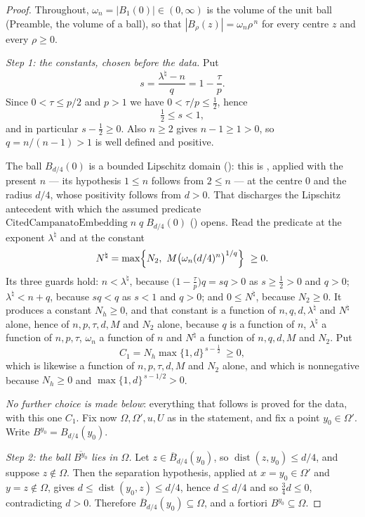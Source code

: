 \begin{proof}
Throughout, $\omega_n=|B_1(0)|\in(0,\infty)$ is the volume of the unit ball
(Preamble, the volume of a ball), so that $|B_\rho(z)|=\omega_n\rho^{\,n}$ for
every centre $z$ and every $\rho\ge0$.

\emph{Step 1: the constants, chosen before the data.}  Put
\[
s=\frac{\lambda^\natural-n}q=1-\frac\tau p .
\]
Since $0<\tau\le p/2$ and $p>1$ we have $0<\tau/p\le\tfrac12$, hence
\[
\tfrac12\le s<1 ,
\]
and in particular $s-\tfrac12\ge0$.  Also $n\ge2$ gives $n-1\ge1>0$, so
$q=n/(n-1)>1$ is well defined and positive.

The ball $B_{d/4}(0)$ is a bounded Lipschitz domain
(): this is ,
applied with the present $n$ --- its hypothesis $1\le n$ follows from $2\le n$
--- at the centre $0$ and the radius $d/4$, whose positivity follows from
$d>0$.  That discharges the Lipschitz antecedent with which the assumed
predicate $\mathrm{CitedCampanatoEmbedding}\;n\;q\;B_{d/4}(0)$
() opens.  Read the predicate at the exponent
$\lambda^\natural$ and at the constant
\[
N^\natural=\max\Bigl\{N_2,\ M\bigl(\omega_n(d/4)^n\bigr)^{1/q}\Bigr\}\ \ge0 .
\]
Its three guards hold: $n<\lambda^\natural$, because
$\bigl(1-\tfrac\tau p\bigr)q=sq>0$ as $s\ge\tfrac12>0$ and $q>0$;
$\lambda^\natural<n+q$, because $sq<q$ as $s<1$ and $q>0$; and
$0\le N^\natural$, because $N_2\ge0$.  It produces a constant $N_h\ge0$, and
that constant is a function of $n,q,d,\lambda^\natural$ and $N^\natural$ alone,
hence of $n,p,\tau,d,M$ and $N_2$ alone, because $q$ is a function of $n$,
$\lambda^\natural$ a function of $n,p,\tau$, $\omega_n$ a function of $n$ and
$N^\natural$ a function of $n,q,d,M$ and $N_2$.  Put
\[
C_1=N_h\max\{1,d\}^{\,s-\frac12}\ \ge0 ,
\]
which is likewise a function of $n,p,\tau,d,M$ and $N_2$ alone, and which is
nonnegative because $N_h\ge0$ and $\max\{1,d\}^{\,s-1/2}>0$.

\emph{No further choice is made below}: everything that follows is proved for
the data, with this one $C_1$.  Fix now $\Omega,\Omega',u,U$ as in the statement,
and fix a point $y_0\in\Omega'$.  Write $B^{y_0}=B_{d/4}(y_0)$.

\emph{Step 2: the ball $\overline{B^{y_0}}$ lies in $\Omega$.}  Let
$z\in\overline B_{d/4}(y_0)$, so $\operatorname{dist}(z,y_0)\le d/4$, and
suppose $z\notin\Omega$.  Then the separation hypothesis, applied at
$x=y_0\in\Omega'$ and $y=z\notin\Omega$, gives
$d\le\operatorname{dist}(y_0,z)\le d/4$, hence $d\le d/4$ and so
$\tfrac34d\le0$, contradicting $d>0$.  Therefore
$\overline B_{d/4}(y_0)\subseteq\Omega$, and a fortiori
$B^{y_0}\subseteq\Omega$.


\end{proof}
